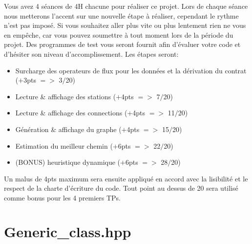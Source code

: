 \documentclass[9pts]{article}
\begin{document}
Vous avez 4 séances de 4H chacune pour réaliser ce projet.
Lors de chaque séance nous metterons l'accent sur une nouvelle étape à réaliser,
cependant le rythme n'est pas imposé.
Si vous souhaitez aller plus vite ou plus lentement rien ne vous en empêche, car vous pouvez soumettre à tout moment lors de la période du projet.
Des programmes de test vous seront fournit afin d'évaluer votre code et d'hésiter son niveau d'accomplissement.
Les étapes seront:
\begin{itemize}
\item Surcharge des operateurs de flux pour les données et la dérivation du contrat ($+$3pts $=>$ 3$/$20)
\item Lecture \& affichage des stations ($+$4pts $=>$ 7$/$20)
\item Lecture \& affichage des connections ($+$4pts $=>$ 11$/$20)
\item Génération \& affichage du graphe ($+$4pts $=>$ 15$/$20)
\item Estimation du meilleur chemin ($+$6pts $=>$ 22$/$20)
\item (BONUS) heuristique dynamique ($+$6pts $=>$ 28$/$20)
\end{itemize}

Un malus de 4pts maximum sera ensuite appliqué en accord avec la lisibilité et le respect de la charte d'écriture du code.
Tout point au dessus de 20 sera utilisé comme bonus pour les 4 premiers TPs. \\

\appendix
\clearpage
\section{Generic\_class.hpp}

\end{document}
